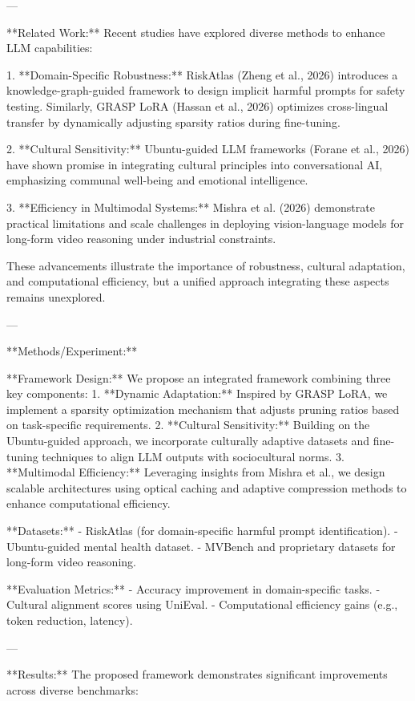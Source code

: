 ---

**Related Work:**  
Recent studies have explored diverse methods to enhance LLM capabilities:  

1. **Domain-Specific Robustness:** RiskAtlas (Zheng et al., 2026) introduces a knowledge-graph-guided framework to design implicit harmful prompts for safety testing. Similarly, GRASP LoRA (Hassan et al., 2026) optimizes cross-lingual transfer by dynamically adjusting sparsity ratios during fine-tuning.  

2. **Cultural Sensitivity:** Ubuntu-guided LLM frameworks (Forane et al., 2026) have shown promise in integrating cultural principles into conversational AI, emphasizing communal well-being and emotional intelligence.  

3. **Efficiency in Multimodal Systems:** Mishra et al. (2026) demonstrate practical limitations and scale challenges in deploying vision-language models for long-form video reasoning under industrial constraints.  

These advancements illustrate the importance of robustness, cultural adaptation, and computational efficiency, but a unified approach integrating these aspects remains unexplored.  

---

**Methods/Experiment:**  

**Framework Design:**  
We propose an integrated framework combining three key components:  
1. **Dynamic Adaptation:** Inspired by GRASP LoRA, we implement a sparsity optimization mechanism that adjusts pruning ratios based on task-specific requirements.  
2. **Cultural Sensitivity:** Building on the Ubuntu-guided approach, we incorporate culturally adaptive datasets and fine-tuning techniques to align LLM outputs with sociocultural norms.  
3. **Multimodal Efficiency:** Leveraging insights from Mishra et al., we design scalable architectures using optical caching and adaptive compression methods to enhance computational efficiency.  

**Datasets:**  
- RiskAtlas (for domain-specific harmful prompt identification).  
- Ubuntu-guided mental health dataset.  
- MVBench and proprietary datasets for long-form video reasoning.  

**Evaluation Metrics:**  
- Accuracy improvement in domain-specific tasks.  
- Cultural alignment scores using UniEval.  
- Computational efficiency gains (e.g., token reduction, latency).  

---

**Results:**  
The proposed framework demonstrates significant improvements across diverse benchmarks:  

